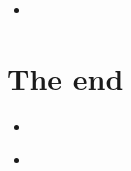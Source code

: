 \documentclass[compress, ucs, xelatex, 11pt, xcolor=x11names, aspectratio=1609,
	hyperref={
		bookmarks=true,
		unicode=true,
		colorlinks=true,
		pdftitle={HybSeq course},
		plainpages=false,
		pdfauthor={Vojtech Zeisek},
		pdfsubject={Practical processing of HybSeq target enrichment sequencing data on computing grids like MetaCentrum},
		pdfcreator={XeLaTeX},
		pdfkeywords={BASH, command line, GNU, HybSeq, Linux, MetaCentrum, sequencing shell, target enrichment},
		linkcolor=Cyan2, %
		anchorcolor=Firebrick2, %
		citecolor=Firebrick2, %
		filecolor=Firebrick2, %
		menucolor=Firebrick2, %
		urlcolor=Chartreuse2, %
		pdftex},
	url={hyphens, lowtilde} %
	]{beamer}
\begin{document}
\begin{frame}[fragile]{}
	\begin{itemize}
		\item 
	\end{itemize}
	\begin{spluscode}
    
	\end{spluscode}
	\begin{bashcode}
    
	\end{bashcode}
\end{frame}

\section{The end}

\begin{frame}[fragile]{}
	\begin{itemize}
		\item 
	\end{itemize}
	\begin{spluscode}
    
	\end{spluscode}
	\begin{bashcode}
    
	\end{bashcode}
\end{frame}

\begin{frame}[fragile]{}
	\begin{itemize}
		\item 
	\end{itemize}
	\begin{spluscode}
    
	\end{spluscode}
	\begin{bashcode}
    
	\end{bashcode}
\end{frame}
\end{document}
